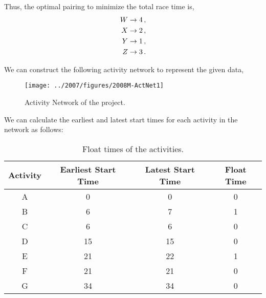 \begin{subquestions}
Thus, the optimal pairing to minimize the total race time is,
\begin{align}
	W \rightarrow 4 \,, \nonumber \\
	X \rightarrow 2 \,, \nonumber \\
	Y \rightarrow 1 \,, \nonumber \\
	Z \rightarrow 3 \,.
\end{align}


\subquestion

We can construct the following activity network to represent the given data,
\begin{figure}[H]
	\begin{center}
		\texttt{[image: ../2007/figures/2008M-ActNet1]}
		\caption{\label{2008M:q2:fig:ActNet1} Activity Network of the project.}
	\end{center}
\end{figure}


\subquestion 

\begin{subsubquestions}
	
\subsubquestion

We can calculate the earliest and latest start times for each activity in the network as follows:
\begin{table}[ht]
	\centering
	\begin{tabular}{|c|c|c|c|}
		\hline
		Activity & Earliest Start Time & Latest Start Time & Float Time \\
		\hline
		A & 0 & 0 & 0 \\
		B & 6 & 7 & 1 \\
		C & 6 & 6 & 0 \\
		D & 15 & 15 & 0 \\
		E & 21 & 22 & 1 \\
		F & 21 & 21 & 0 \\
		G & 34 & 34 & 0 \\
		\hline
	\end{tabular}
	\caption{\label{2008M:q2:tab:ActNet2} Float times of the activities.}
\end{table} 


\end{subsubquestions}
\end{subquestions}
